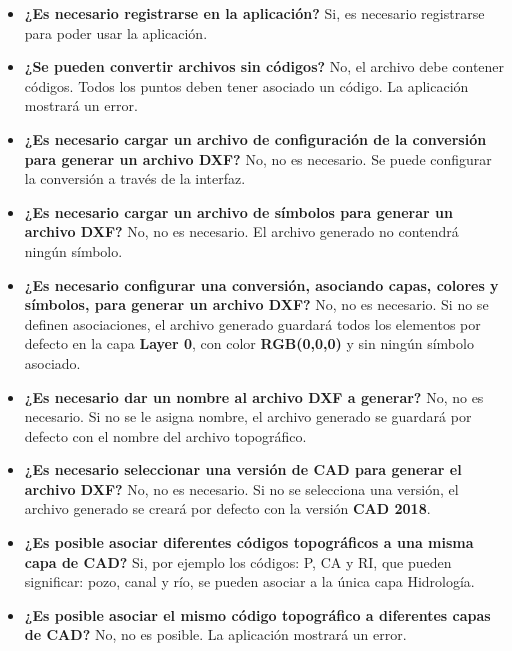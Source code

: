\begin{itemize}
\item \textbf{\textbf{¿Es necesario registrarse en la aplicación?}} Si, es necesario registrarse para poder usar la aplicación.

\item \textbf{\textbf{¿Se pueden convertir archivos sin códigos?}} No, el archivo debe contener códigos. Todos los puntos deben tener asociado un código. La aplicación mostrará un error.

\item \textbf{\textbf{¿Es necesario cargar un archivo de configuración de la conversión para generar un archivo DXF?}} No, no es necesario. Se puede configurar la conversión a través de la interfaz.

\item \textbf{\textbf{¿Es necesario cargar un archivo de símbolos para generar un archivo DXF?}} No, no es necesario. El archivo generado no contendrá ningún símbolo.

\item \textbf{\textbf{¿Es necesario configurar una conversión, asociando capas, colores y símbolos, para generar un archivo DXF?}} No, no es necesario. Si no se definen asociaciones, el archivo generado guardará todos los elementos por defecto en la capa \textbf{Layer 0}, con color \textbf{RGB(0,0,0)} y sin ningún símbolo asociado.

\item \textbf{\textbf{¿Es necesario dar un nombre al archivo DXF a generar?}} No, no es necesario. Si no se le asigna nombre, el archivo generado se guardará por defecto con el nombre del archivo topográfico.

\item \textbf{\textbf{¿Es necesario seleccionar una versión de CAD para generar el archivo DXF?}} No, no es necesario. Si no se selecciona una versión, el archivo generado se creará por defecto con la versión \textbf{CAD 2018}.

\item \textbf{\textbf{¿Es posible asociar diferentes códigos topográficos a una misma capa de CAD?}} Si, por ejemplo los códigos: P, CA y RI, que pueden significar: pozo, canal y río, se pueden asociar a la única capa Hidrología.

\item \textbf{\textbf{¿Es posible asociar el mismo código topográfico a diferentes capas de CAD?}} No, no es posible. La aplicación mostrará un error.


\end{itemize}
